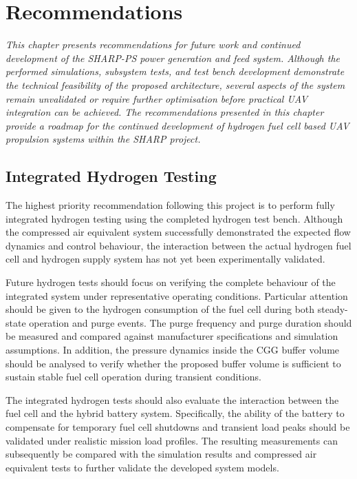 
\chapter{Recommendations}%
\label{chap:recommendations}%
\emph{This chapter presents recommendations for future work and continued development of the SHARP-PS power generation and feed system. Although the performed simulations, subsystem tests, and test bench development demonstrate the technical feasibility of the proposed architecture, several aspects of the system remain unvalidated or require further optimisation before practical UAV integration can be achieved. The recommendations presented in this chapter provide a roadmap for the continued development of hydrogen fuel cell based UAV propulsion systems within the SHARP project.}
\newpage

\section{Integrated Hydrogen Testing}
The highest priority recommendation following this project is to perform fully integrated hydrogen testing using the completed hydrogen test bench. Although the compressed air equivalent system successfully demonstrated the expected flow dynamics and control behaviour, the interaction between the actual hydrogen fuel cell and hydrogen supply system has not yet been experimentally validated.

Future hydrogen tests should focus on verifying the complete behaviour of the integrated system under representative operating conditions. Particular attention should be given to the hydrogen consumption of the fuel cell during both steady-state operation and purge events. The purge frequency and purge duration should be measured and compared against manufacturer specifications and simulation assumptions. In addition, the pressure dynamics inside the CGG buffer volume should be analysed to verify whether the proposed buffer volume is sufficient to sustain stable fuel cell operation during transient conditions.

The integrated hydrogen tests should also evaluate the interaction between the fuel cell and the hybrid battery system. Specifically, the ability of the battery to compensate for temporary fuel cell shutdowns and transient load peaks should be validated under realistic mission load profiles. The resulting measurements can subsequently be compared with the simulation results and compressed air equivalent tests to further validate the developed system models.


